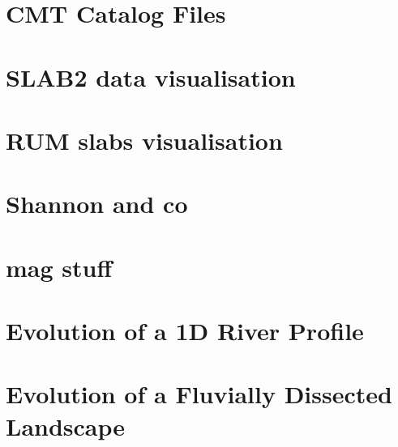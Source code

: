 \documentclass[a4paper,11pt]{report}
\begin{document}
\chapter{CMT Catalog Files\label{f134}} %

\chapter{SLAB2 data visualisation\label{f135}} %

\chapter{RUM slabs visualisation\label{f136}} %

\chapter{Shannon and co \label{f137}} %

\chapter{mag stuff \label{f138}} %

\chapter{Evolution of a 1D River Profile\label{f139}} %

\chapter{Evolution of a Fluvially Dissected Landscape \label{f140}} %
\end{document}
